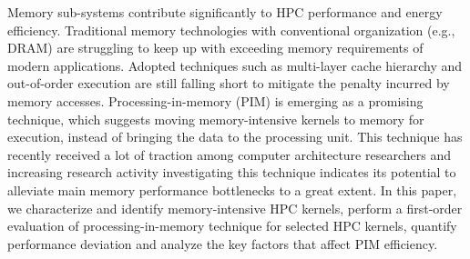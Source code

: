 Memory sub-systems contribute significantly to HPC performance and energy efficiency. Traditional memory technologies with conventional organization (e.g., DRAM) are struggling to keep up with exceeding memory requirements of modern applications. Adopted techniques such as multi-layer cache hierarchy and out-of-order execution are still falling short to mitigate the penalty incurred by memory accesses. Processing-in-memory (PIM) is emerging as a promising technique, which suggests moving memory-intensive kernels to memory for execution, instead of bringing the data to the processing unit. This technique has recently received a lot of traction among computer architecture researchers and increasing research activity investigating this technique indicates its potential to alleviate main memory performance bottlenecks to a great extent. In this paper, we characterize and identify memory-intensive HPC kernels, perform a first-order evaluation of processing-in-memory technique for selected HPC kernels, quantify performance deviation and analyze the key factors that affect PIM efficiency.   